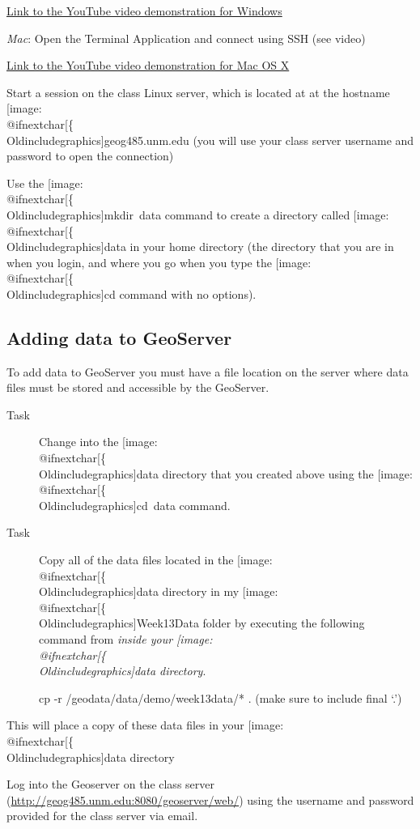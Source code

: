 \documentclass[]{book}
\makeatletter
\providecommand{\tightlist}{%
  \setlength{\itemsep}{0pt}\setlength{\parskip}{0pt}}
\def\ScaleIfNeeded{%
  \ifdim\Gin@nat@width>.5\linewidth
    .5\linewidth
  \else
    \Gin@nat@width
  \fi
}
\let\Oldincludegraphics\texttt{[image: \%
 \\catcode`\\@=11\\relax\%
 \%\\gdef\\includegraphics\{\\@ifnextchar[\{\\Oldincludegraphics]}{\Oldincludegraphics[width=\ScaleIfNeeded]}}%
\gdef\texttt{[image: \\@ifnextchar[\{\\Oldincludegraphics]}{\Oldincludegraphics[max size={.75\textwidth}{.75\textheight}]}}%
\makeatother
\begin{document}
\href{http://youtu.be/GdO_n89mey8}{Link to the YouTube video
demonstration for Windows}

\emph{Mac}: Open the Terminal Application and connect using SSH (see
video)

\href{http://youtu.be/Gu_ij6HxTWo}{Link to the YouTube video
demonstration for Mac OS X}

Start a session on the class Linux server, which is located at at the
hostname \texttt{geog485.unm.edu} (you will use your class server
username and password to open the connection)

\begin{description}
\tightlist
\item[Task]
Use the \texttt{mkdir\ data} command to create a directory called
\texttt{data} in your home directory (the directory that you are in when
you login, and where you go when you type the \texttt{cd} command with
no options).
\end{description}

\subsection{Adding data to GeoServer}\label{adding-data-to-geoserver}

To add data to GeoServer you must have a file location on the server
where data files must be stored and accessible by the GeoServer.

\begin{description}
\item[Task]
Change into the \texttt{data} directory that you created above using the
\texttt{cd\ data} command.
\item[Task]
Copy all of the data files located in the \texttt{data} directory in my
\texttt{Week13Data} folder by executing the following command from
\emph{inside your \texttt{data} directory}.

cp -r /geodata/data/demo/week13data/* . (make sure to include final `.')
\end{description}

This will place a copy of these data files in your \texttt{data}
directory

\begin{description}
\tightlist
\item[Task]
Log into the Geoserver on the class server
(\url{http://geog485.unm.edu:8080/geoserver/web/}) using the username
and password provided for the class server via email.
\end{description}
\end{document}
